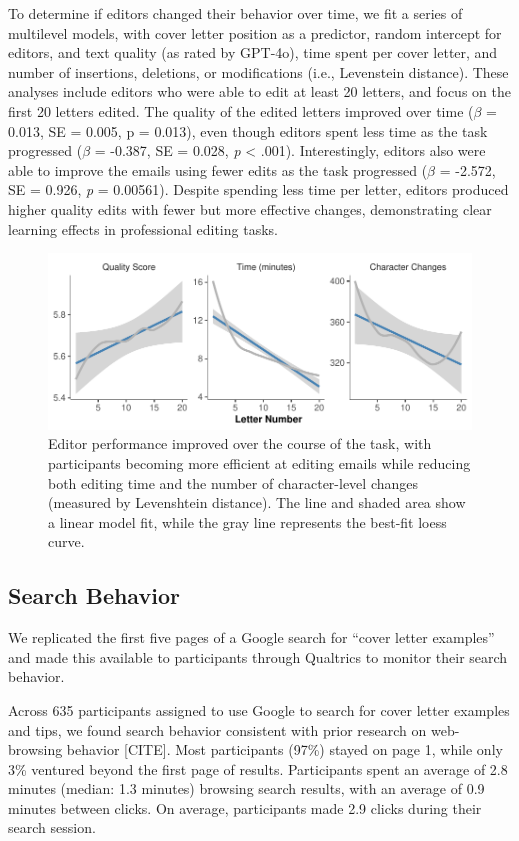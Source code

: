 \documentclass[11pt]{report}
\begin{document}
\begin{append}
To determine if editors changed their behavior over time, we fit a series of multilevel models, with cover letter position as a predictor, random intercept for editors, and text quality (as rated by GPT-4o), time spent per cover letter, and number of insertions, deletions, or modifications (i.e., Levenstein distance). These analyses include editors who were able to edit at least 20 letters, and focus on the first 20 letters edited. The quality of the edited letters improved over time ($\beta$ = 0.013, SE = 0.005, p = 0.013), even though editors spent less time as the task progressed ($\beta$ = -0.387, SE = 0.028, \textit{p} < .001). Interestingly, editors also were able to improve the emails using fewer edits as the task progressed ($\beta$ = -2.572, SE = 0.926, \textit{p} = 0.00561). Despite spending less time per letter, editors produced higher quality edits with fewer but more effective changes, demonstrating clear learning effects in professional editing tasks.

\begin{figure}
    \centering
    \includegraphics[width=0.75\linewidth]{editors_over_time.pdf}
\caption{Editor performance improved over the course of the task, with participants becoming more efficient at editing emails while reducing both editing time and the number of character-level changes (measured by Levenshtein distance). The line and shaded area show a linear model fit, while the gray line represents the best-fit loess curve.}
    \label{fig:editors_over_time}
\end{figure}

\subsection{Search Behavior}

We replicated the first five pages of a Google search for “cover letter examples” and made this available to participants through Qualtrics to monitor their search behavior.

Across 635 participants assigned to use Google to search for cover letter examples and tips, we found search behavior consistent with prior research on web-browsing behavior [CITE]. Most participants (97\%) stayed on page 1, while only 3\% ventured beyond the first page of results. Participants spent an average of 2.8 minutes (median: 1.3 minutes) browsing search results, with an average of 0.9 minutes between clicks. On average, participants made 2.9 clicks during their search session.


\end{append}
\end{document}
